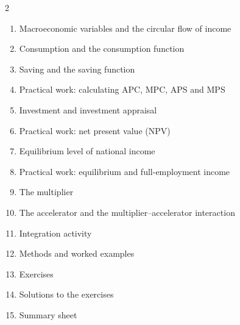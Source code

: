 \documentclass[11pt]{article}
\begin{document}
\begin{sommaire}
\begin{multicols}{2}
\begin{enumerate}
\item Macroeconomic variables and the circular flow of income
\item Consumption and the consumption function
\item Saving and the saving function
\item Practical work: calculating APC, MPC, APS and MPS
\item Investment and investment appraisal
\item Practical work: net present value (NPV)
\item Equilibrium level of national income
\item Practical work: equilibrium and full-employment income
\item The multiplier
\item The accelerator and the multiplier–accelerator interaction
\item Integration activity
\item Methods and worked examples
\item Exercises
\item Solutions to the exercises
\item Summary sheet
\end{enumerate}
\end{multicols}
\end{sommaire}
\end{document}
